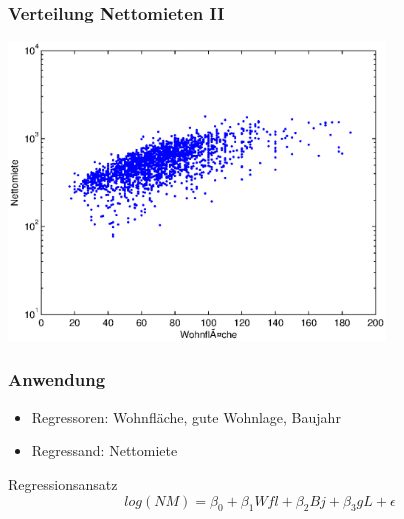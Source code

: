 \documentclass{beamer}
\begin{document}
\begin{frame}
  \frametitle{Verteilung Nettomieten II}
  \begin{center}
    \includegraphics[width=10cm]{figures/nm_wfl_distribution_log}
  \end{center}
\end{frame}

\begin{frame}
  \frametitle{Anwendung}
  

  \begin{itemize}
  \item Regressoren: Wohnfläche, gute Wohnlage, Baujahr
  \item Regressand: Nettomiete
  \end{itemize}

  \begin{block}{Regressionsansatz}
    \begin{equation*}
      log(NM) = \beta_0 + \beta_1 Wfl + \beta_2 Bj + \beta_3 gL + \epsilon
    \end{equation*}
  \end{block}


\end{frame}
\end{document}
